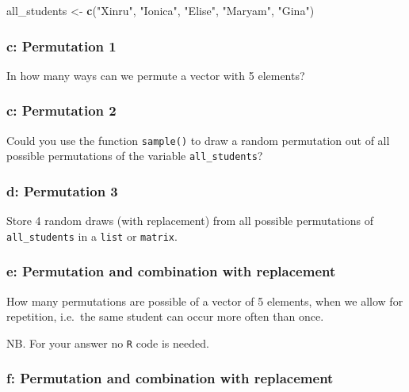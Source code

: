 \documentclass[]{article}
\newenvironment{Shaded}{\begin{snugshade}}{\end{snugshade}}
\newcommand{\KeywordTok}[1]{\textcolor[rgb]{0.13,0.29,0.53}{\textbf{#1}}}
\newcommand{\NormalTok}[1]{#1}
\newcommand{\StringTok}[1]{\textcolor[rgb]{0.31,0.60,0.02}{#1}}
\begin{document}
\begin{Shaded}
\begin{Highlighting}[]
\NormalTok{all_students <-}\StringTok{ }\KeywordTok{c}\NormalTok{(}\StringTok{"Xinru"}\NormalTok{, }\StringTok{"Ionica"}\NormalTok{, }\StringTok{"Elise"}\NormalTok{, }\StringTok{"Maryam"}\NormalTok{, }\StringTok{"Gina"}\NormalTok{) }
\end{Highlighting}
\end{Shaded}

\hypertarget{c-permutation-1}{%
\subsubsection{c: Permutation 1}\label{c-permutation-1}}

In how many ways can we permute a vector with 5 elements?

\hypertarget{c-permutation-2}{%
\subsubsection{c: Permutation 2}\label{c-permutation-2}}

Could you use the function \texttt{sample()} to draw a random
permutation out of all possible permutations of the variable
\texttt{all\_students}?

\hypertarget{d-permutation-3}{%
\subsubsection{d: Permutation 3}\label{d-permutation-3}}

Store 4 random draws (with replacement) from all possible permutations
of \texttt{all\_students} in a \texttt{list} or \texttt{matrix}.

\hypertarget{e-permutation-and-combination-with-replacement}{%
\subsubsection{e: Permutation and combination with
replacement}\label{e-permutation-and-combination-with-replacement}}

How many permutations are possible of a vector of 5 elements, when we
allow for repetition, i.e.~the same student can occur more often than
once.

NB. For your answer no \texttt{R} code is needed.

\hypertarget{f-permutation-and-combination-with-replacement}{%
\subsubsection{f: Permutation and combination with
replacement}\label{f-permutation-and-combination-with-replacement}}
\end{document}
